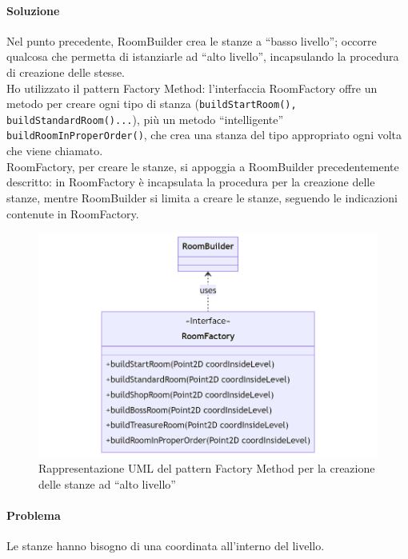 \documentclass[a4paper,12pt]{report}
\begin{document}
\paragraph{Soluzione} Nel punto precedente, RoomBuilder crea le stanze a ``basso livello''; occorre qualcosa che permetta
di istanziarle ad ``alto livello'', incapsulando la procedura di creazione delle stesse. 
\\Ho utilizzato il pattern Factory Method: l'interfaccia RoomFactory offre un metodo
per creare ogni tipo di stanza (\texttt{buildStartRoom(), buildStandardRoom()...}),
più un metodo ``intelligente'' \texttt{buildRoomInProperOrder()}, che crea una stanza del tipo appropriato ogni volta che viene chiamato.
\\RoomFactory, per creare le stanze, si appoggia a RoomBuilder precedentemente descritto: in RoomFactory è incapsulata la procedura per la creazione delle stanze, mentre RoomBuilder si limita a creare le stanze, seguendo le indicazioni contenute in RoomFactory.
\begin{figure}[H]
    \centering{}
    \includegraphics[scale=0.5]{diagram/roomFactory.png}
    \caption{Rappresentazione UML del pattern Factory Method per la creazione delle stanze ad ``alto livello''}
    \label{img:roomFactory}
\end{figure}


\paragraph{Problema} Le stanze hanno bisogno di una coordinata all'interno del livello.
\end{document}
